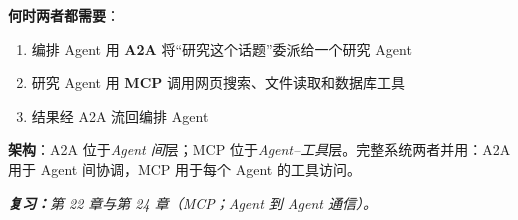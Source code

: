 \begin{questionbox}
\textbf{何时两者都需要}：

\begin{enumerate}
  \item 编排 Agent 用 \textbf{A2A} 将“研究这个话题”委派给一个研究 Agent
  \item 研究 Agent 用 \textbf{MCP} 调用网页搜索、文件读取和数据库工具
  \item 结果经 A2A 流回编排 Agent
\end{enumerate}

\textbf{架构}：A2A 位于\emph{Agent 间}层；MCP 位于\emph{Agent–工具}层。完整系统两者并用：A2A 用于 Agent 间协调，MCP 用于每个 Agent 的工具访问。

\emph{\textbf{复习：}第 22 章与第 24 章（MCP；Agent 到 Agent 通信）。}
\end{questionbox}

